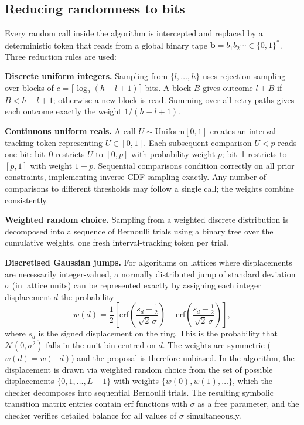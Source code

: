 \documentclass[twocolumn,10pt]{article}
\begin{document}
\subsection{Reducing randomness to bits}

Every random call inside the algorithm is intercepted and replaced by a
deterministic token that reads from a global binary tape $\mathbf{b} =
b_1 b_2\cdots\in\{0,1\}^*$.  Three reduction rules are used:

\smallskip\noindent\textbf{Discrete uniform integers.}
Sampling from $\{l,\ldots,h\}$ uses rejection sampling over blocks of
$c=\lceil\log_2(h-l+1)\rceil$ bits.  A block $B$ gives outcome $l+B$ if
$B<h-l+1$; otherwise a new block is read.  Summing over all retry paths
gives each outcome exactly the weight $1/(h-l+1)$.

\smallskip\noindent\textbf{Continuous uniform reals.}
A call $U\sim\mathrm{Uniform}[0,1]$ creates an interval-tracking token
representing $U\in[0,1]$.  Each subsequent comparison $U<p$ reads one bit:
bit~0 restricts $U$ to $[0,p]$ with probability weight $p$; bit~1 restricts
to $[p,1]$ with weight $1-p$.  Sequential comparisons condition correctly on
all prior constraints, implementing inverse-CDF sampling exactly.  Any number
of comparisons to different thresholds may follow a single call; the weights
combine consistently.

\smallskip\noindent\textbf{Weighted random choice.}
Sampling from a weighted discrete distribution is decomposed into a sequence
of Bernoulli trials using a binary tree over the cumulative weights, one fresh
interval-tracking token per trial.

\smallskip\noindent\textbf{Discretised Gaussian jumps.}
For algorithms on lattices where displacements are necessarily integer-valued,
a normally distributed jump of standard deviation $\sigma$ (in lattice units)
can be represented exactly by assigning each integer displacement $d$ the
probability
\begin{equation}
  w(d) = \frac{1}{2}\!\left[\mathrm{erf}\!\left(\frac{s_d+\tfrac12}{\sqrt{2}\,\sigma}\right)
  - \mathrm{erf}\!\left(\frac{s_d-\tfrac12}{\sqrt{2}\,\sigma}\right)\right],
  \label{eq:normalbin}
\end{equation}
where $s_d$ is the signed displacement on the ring.  This is the probability
that $\mathcal{N}(0,\sigma^2)$ falls in the unit bin centred on $d$.  The
weights are symmetric ($w(d)=w(-d)$) and the proposal is therefore unbiased.
In the algorithm, the displacement is drawn via weighted random choice from the
set of possible displacements $\{0,1,\ldots,L-1\}$ with weights
$\{w(0),w(1),\ldots\}$, which the checker decomposes into sequential Bernoulli
trials.  The resulting symbolic transition matrix entries contain $\mathrm{erf}$
functions with $\sigma$ as a free parameter, and the checker verifies detailed
balance for all values of $\sigma$ simultaneously.
\end{document}
